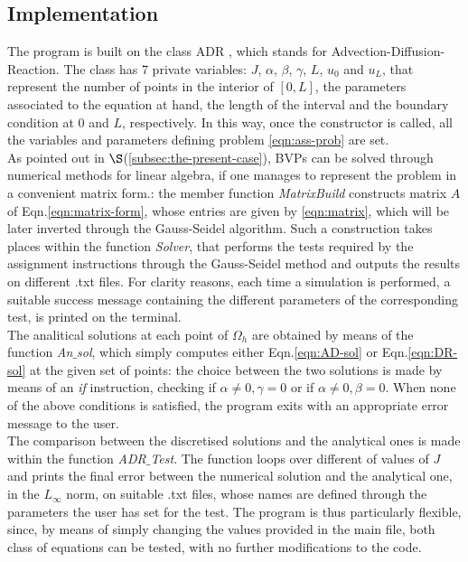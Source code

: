 \documentclass[11pt]{article}
\theoremstyle{theorem}
\theoremstyle{definition}
\begin{document}
\subsection{Implementation}
The program is built on the class ADR , which stands for Advection-Diffusion-Reaction. The class has 7 private variables: $J$, $\alpha$, $\beta$, $\gamma$, $L$, $u_0$ and $u_L$, that represent the number of points in the interior of $[0,L]$, the parameters associated to the equation at hand, the length of the interval and the boundary condition at $0$ and $L$, respectively. In this way, once the constructor is called, all the variables and parameters defining problem \eqref{eqn:ass-prob} are set.\\
As pointed out in $\S$(\ref{subsec:the-present-case}), BVPs can be solved through numerical methods for linear algebra, if one manages to represent the problem in a convenient matrix form.: the member function \emph{MatrixBuild} constructs matrix $A$ of Eqn.\eqref{eqn:matrix-form}, whose entries are given by \eqref{eqn:matrix}, which will be later inverted through the Gauss-Seidel algorithm. Such a construction takes places within the function \emph{Solver}, that performs the tests required by the assignment instructions through the Gauss-Seidel method and outputs the results on different .txt files. For clarity reasons,  each time a simulation is performed, a suitable success message containing the different parameters of the corresponding test, is printed on the terminal.\\
The analitical solutions at each point of $\Omega_h$ are obtained by means of the function \emph{An$\_$sol}, which simply computes either Eqn.\eqref{eqn:AD-sol} or Eqn.\eqref{eqn:DR-sol} at the given set of points: the choice between the two solutions is made by means of an \emph{if} instruction, checking if $\alpha\neq 0, \gamma=0$ or if $\alpha\neq 0, \beta=0$. When none of the above conditions is satisfied, the program exits with an appropriate error message to the user.\\
The comparison between the discretised solutions and the analytical ones is made within the function \emph{ADR$\_$Test}. The function loops over different of values of $J$ and prints the final error between the numerical solution and the analytical one, in the $L_\infty$ norm, on suitable .txt files, whose names are defined through the parameters the user has set for the test. The program is thus particularly flexible, since, by means of simply changing the values provided in the main file, both class of equations can be tested, with no further modifications to the code.\\ 
\end{document}
